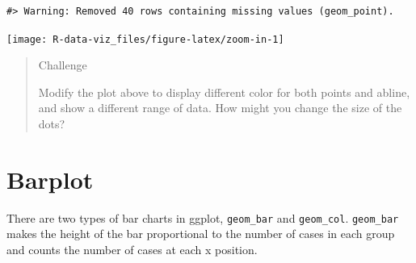 \documentclass[]{book}
\newenvironment{Shaded}{\begin{snugshade}}{\end{snugshade}}
\newcommand{\KeywordTok}[1]{\textcolor[rgb]{0.13,0.29,0.53}{\textbf{#1}}}
\newcommand{\DataTypeTok}[1]{\textcolor[rgb]{0.13,0.29,0.53}{#1}}
\newcommand{\DecValTok}[1]{\textcolor[rgb]{0.00,0.00,0.81}{#1}}
\newcommand{\FloatTok}[1]{\textcolor[rgb]{0.00,0.00,0.81}{#1}}
\newcommand{\StringTok}[1]{\textcolor[rgb]{0.31,0.60,0.02}{#1}}
\newcommand{\OperatorTok}[1]{\textcolor[rgb]{0.81,0.36,0.00}{\textbf{#1}}}
\newcommand{\NormalTok}[1]{#1}
\theoremstyle{definition}
\theoremstyle{definition}
\theoremstyle{definition}
\theoremstyle{remark}
\begin{document}
\begin{Shaded}
\end{Shaded}

\begin{verbatim}
#> Warning: Removed 40 rows containing missing values (geom_point).
\end{verbatim}

\texttt{[image: R-data-viz\_files/figure-latex/zoom-in-1]}

\begin{quote}
Challenge

Modify the plot above to display different color for both points and
abline, and show a different range of data. How might you change the
size of the dots?
\end{quote}

\section{Barplot}\label{barplot}

There are two types of bar charts in ggplot, \texttt{geom\_bar} and
\texttt{geom\_col}. \texttt{geom\_bar} makes the height of the bar
proportional to the number of cases in each group and counts the number
of cases at each x position.
\end{document}
